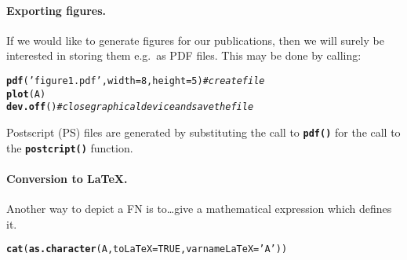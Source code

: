 \documentclass[11pt]{article}\usepackage[]{graphicx}\usepackage[]{color}
\makeatletter
\newcommand{\hlnum}[1]{\textcolor[rgb]{0.686,0.059,0.569}{#1}}%
\newcommand{\hlstr}[1]{\textcolor[rgb]{0.192,0.494,0.8}{#1}}%
\newcommand{\hlcom}[1]{\textcolor[rgb]{0.678,0.584,0.686}{\textit{#1}}}%
\newcommand{\hlstd}[1]{\textcolor[rgb]{0.345,0.345,0.345}{#1}}%
\newcommand{\hlkwc}[1]{\textcolor[rgb]{0.333,0.667,0.333}{#1}}%
\newcommand{\hlkwd}[1]{\textcolor[rgb]{0.737,0.353,0.396}{\textbf{#1}}}%
\newenvironment{kframe}{%
 \def\at@end@of@kframe{}%
 \ifinner\ifhmode%
  \def\at@end@of@kframe{\end{minipage}}%
  \begin{minipage}{\columnwidth}%
 \fi\fi%
 \def\FrameCommand##1{\hskip\@totalleftmargin \hskip-\fboxsep
 \colorbox{shadecolor}{##1}\hskip-\fboxsep
     \hskip-\linewidth \hskip-\@totalleftmargin \hskip\columnwidth}%
 \MakeFramed {\advance\hsize-\width
   \@totalleftmargin\z@ \linewidth\hsize
   \@setminipage}}%
 {\par\unskip\endMakeFramed%
 \at@end@of@kframe}
\newenvironment{knitrout}{}{} %
\newcommand{\func}[1]{\texttt{\hlkwd{#1}}}
\makeatother
\begin{document}
\paragraph{Exporting figures.}
If we would like to generate figures for our publications,
then we will surely be interested in storing them e.g.~as PDF files.
This may be done by calling:

\begin{knitrout}\small
{}\color{fgcolor}\begin{kframe}
\begin{alltt}
\hlkwd{pdf}\hlstd{(}\hlstr{'figure1.pdf'}\hlstd{,} \hlkwc{width}\hlstd{=}\hlnum{8}\hlstd{,} \hlkwc{height}\hlstd{=}\hlnum{5}\hlstd{)} \hlcom{# create file}
\hlkwd{plot}\hlstd{(A)}
\hlkwd{dev.off}\hlstd{()} \hlcom{# close graphical device and save the file}
\end{alltt}
\end{kframe}
\end{knitrout}

\noindent
Postscript (PS) files are generated by substituting the call
to \func{pdf()} for the call to the \func{postcript()} function.


\paragraph{Conversion to \LaTeX.}
Another way to depict a FN is to\dots give a mathematical expression
which defines it.

\begin{knitrout}\small
{}\color{fgcolor}\begin{kframe}
\begin{alltt}
\hlkwd{cat}\hlstd{(}\hlkwd{as.character}\hlstd{(A,} \hlkwc{toLaTeX}\hlstd{=}\hlnum{TRUE}\hlstd{,} \hlkwc{varnameLaTeX}\hlstd{=}\hlstr{'A'}\hlstd{))}
\end{alltt}
\end{kframe}
\end{knitrout}
\end{document}
